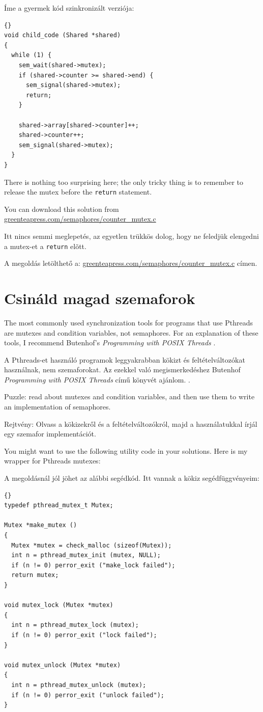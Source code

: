\documentclass{book}
\newcommand{\clearemptydoublepage}{\newpage\cleardoublepage}
\begin{document}
Íme a gyermek kód szinkronizált verziója:

\begin{lstlisting}[title={}]{}
void child_code (Shared *shared)
{
  while (1) {
    sem_wait(shared->mutex);
    if (shared->counter >= shared->end) {
      sem_signal(shared->mutex);
      return;
    }

    shared->array[shared->counter]++;
    shared->counter++;
    sem_signal(shared->mutex);
  }
}
\end{lstlisting}

There is nothing too surprising here; the only tricky thing
is to remember to release the mutex before the {\tt return}
statement.

You can download this solution from 
\url{greenteapress.com/semaphores/counter_mutex.c}

Itt nincs semmi meglepetés, az egyetlen trükkös dolog, hogy ne feledjük elengedni a mutex-et a  {\tt return} elõtt.

A megoldás letölthető a:
\url{greenteapress.com/semaphores/counter_mutex.c} címen.


\clearemptydoublepage
\section{Csináld magad szemaforok}
\label{makeyourown}

The most commonly used synchronization tools for programs that use
Pthreads are mutexes and condition variables, not semaphores.  For an
explanation of these tools, I recommend Butenhof's {\em Programming
with POSIX Threads} \cite{butenhof}.

A Pthreads-et használó programok leggyakrabban kökizt és feltételváltozókat
használnak, nem szemaforokat. Az ezekkel való megismerkedéshez
Butenhof {\em Programming with POSIX Threads} című könyvét ajánlom. \cite{butenhof}.

Puzzle: read about mutexes and condition variables, and then
use them to write an implementation of semaphores.

Rejtvény: Olvass a kökizekről és a feltételváltozókról, majd
a használatukkal írjál egy szemafor implementációt.

You might want to use the following utility code in your solutions.
Here is my wrapper for Pthreads mutexes:

A megoldásnál jól jöhet az alábbi segédkód.
Itt vannak a kökiz segédfüggvényeim:

\begin{lstlisting}[title={}]{}
typedef pthread_mutex_t Mutex;

Mutex *make_mutex ()
{
  Mutex *mutex = check_malloc (sizeof(Mutex));
  int n = pthread_mutex_init (mutex, NULL);
  if (n != 0) perror_exit ("make_lock failed"); 
  return mutex;
}

void mutex_lock (Mutex *mutex)
{
  int n = pthread_mutex_lock (mutex);
  if (n != 0) perror_exit ("lock failed");
}

void mutex_unlock (Mutex *mutex)
{
  int n = pthread_mutex_unlock (mutex);
  if (n != 0) perror_exit ("unlock failed");
}
\end{lstlisting}
\end{document}
